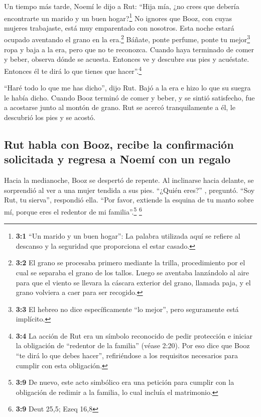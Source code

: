  Un tiempo más tarde, Noemí le dijo a Rut: ``Hija mía, ¿no
crees que debería encontrarte un marido y un buen hogar?\footnote{\textbf{3:1}
  ``Un marido y un buen hogar'': La palabra utilizada aquí se refiere al
  descanso y la seguridad que proporciona el estar casado.}
 No ignores que Booz, con cuyas mujeres trabajaste, está
muy emparentado con nosotros. Esta noche estará ocupado aventando el
grano en la era.\footnote{\textbf{3:2} El grano se procesaba primero
  mediante la trilla, procedimiento por el cual se separaba el grano de
  los tallos. Luego se aventaba lanzándolo al aire para que el viento se
  llevara la cáscara exterior del grano, llamada paja, y el grano
  volviera a caer para ser recogido.}  Báñate, ponte
perfume, ponte tu mejor\footnote{\textbf{3:3} El hebreo no dice
  específicamente ``lo mejor'', pero seguramente está implícito.} ropa y
baja a la era, pero que no te reconozca. Cuando haya terminado de comer
y beber,  observa dónde se acuesta. Entonces ve y descubre
sus pies y acuéstate. Entonces él te dirá lo que tienes que
hacer''.\footnote{\textbf{3:4} La acción de Rut era un símbolo
  reconocido de pedir protección e iniciar la obligación de ``redentor
  de la familia'' (véase 2:20). Por eso dice que Booz ``te dirá lo que
  debes hacer'', refiriéndose a los requisitos necesarios para cumplir
  con esta obligación.}

 ``Haré todo lo que me has dicho'', dijo Rut.
 Bajó a la era e hizo lo que su suegra le había dicho.
 Cuando Booz terminó de comer y beber, y se sintió
satisfecho, fue a acostarse junto al montón de grano. Rut se acercó
tranquilamente a él, le descubrió los pies y se acostó.

\hypertarget{rut-habla-con-booz-recibe-la-confirmaciuxf3n-solicitada-y-regresa-a-noemuxed-con-un-regalo}{%
\subsection{Rut habla con Booz, recibe la confirmación solicitada y
regresa a Noemí con un
regalo}\label{rut-habla-con-booz-recibe-la-confirmaciuxf3n-solicitada-y-regresa-a-noemuxed-con-un-regalo}}

 Hacia la medianoche, Booz se despertó de repente. Al
inclinarse hacia delante, se sorprendió al ver a una mujer tendida a sus
pies.  ``¿Quién eres?'' , preguntó. ``Soy Rut, tu
sierva'', respondió ella. ``Por favor, extiende la esquina de tu manto
sobre mí, porque eres el redentor de mi familia''.\footnote{\textbf{3:9}
  De nuevo, este acto simbólico era una petición para cumplir con la
  obligación de redimir a la familia, lo cual incluía el matrimonio.}
\footnote{\textbf{3:9} Deut 25,5; Ezeq 16,8}

